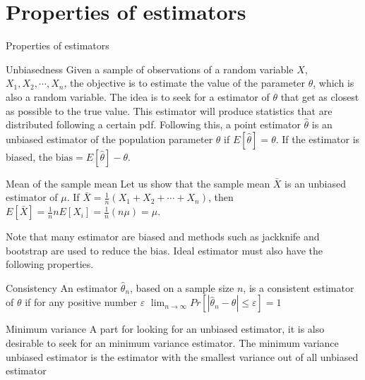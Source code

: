 \documentclass[8pt]{beamer}
\renewcommand{\emph}[1]{\textcolor{myorange}{#1}}
\begin{document}
\section{Properties of estimators}
\begin{frame}{Properties of estimators}
    
    \begin{block}{Unbiasedness}
        Given a sample of observations of a random variable $X$, $X_1, X_2, \cdots, X_n$, the objective is to estimate the value of the parameter $\theta$, which is also a random variable. The idea is to seek for a \emph{estimator} of  $\theta$ that get as closest as possible to the \emph{true value}. This estimator will produce statistics that are distributed following a certain \emph{pdf}. Following this, a \alert{point estimator $\hat{\theta}$}  is an \alert{unbiased estimator} of the population parameter $\theta$ if $E[\hat{\theta}] = \theta$. If the estimator is biased, the $\text{bias} = E[\hat{\theta}] - \theta$.
    \end{block}
    
    \begin{exampleblock}{Mean of the sample mean}
        Let us show that the sample mean $\bar{X}$ is an unbiased estimator of $\mu$. If $\bar{X} = \frac{1}{n} \left( X_1 + X_2 + \cdots + X_n \right) $, then $E[\bar{X}] = \frac{1}{n} nE[X_i] = \frac{1}{n} (n \mu) = \mu$. 
    \end{exampleblock}
    Note that many estimator are biased and methods such as \emph{jackknife} and \emph{bootstrap} are used to reduce the bias. Ideal estimator must also have the following properties. 
    \begin{block}{Consistency}
        An estimator $\hat{\theta}_n$, based on a sample size $n$, is a \alert{consistent} estimator of $\theta$ if for any positive number $\varepsilon$ $\lim_{n\rightarrow \infty} Pr[ | \hat{\theta}_n - \theta | \leq \varepsilon ] = 1$
    \end{block}

    \begin{block}{Minimum variance}
        A part for looking for an unbiased estimator, it is also desirable to seek for an \alert{minimum variance estimator}. The \emph{minimum variance unbiased estimator} is the estimator with the smallest variance out of all unbiased estimator
    \end{block}


\end{frame}
    
\end{document}
